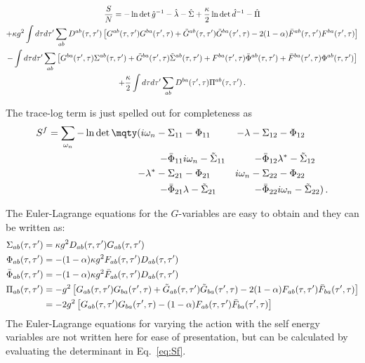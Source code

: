 \begin{widetext}
    \begin{multline}
        \label{eq:Sbeforesiding}
        \frac{S}{N} = - \ln\det{\hat{g}^{-1} -\hat{\lambda}-\hat{\Sigma}} +  \frac{\kappa}{2} \ln\det{\hat{d}^{-1}-\hat{\Pi}}
        \\
        + \kappa g^2\int d\tau d\tau^\prime\sum_{ab} D^{ab}(\tau,\tau^\prime)\left[G^{ab}(\tau,\tau^\prime)G^{ba}(\tau^\prime,\tau) +\Tilde{G}^{ab}(\tau,\tau^\prime)\Tilde{G}^{ba}(\tau^\prime,\tau) - 2(1-\alpha)\bar{F}^{ab}(\tau,\tau^\prime)F^{ba}(\tau^\prime,\tau)\right]
        \\
        - \int d\tau d\tau^\prime\sum_{ab} \left[
        G^{ba}(\tau^\prime,\tau)\Sigma^{ab}(\tau,\tau^\prime)
        + \Tilde{G}^{ba}(\tau^\prime,\tau)\Tilde{\Sigma}^{ab}(\tau,\tau^\prime)
        + F^{ba}(\tau^\prime,\tau) \Bar{\Phi}^{ab}(\tau,\tau^\prime)
        + \Bar{F}^{ba}(\tau^\prime,\tau)\Phi^{ab}(\tau,\tau^\prime) \right]
        \\
        +\frac{\kappa}{2}\int d\tau d\tau^\prime\sum_{ab}
        D^{ba}(\tau^\prime,\tau) \Pi^{ab}(\tau,\tau^\prime) \,.
\end{multline}
\end{widetext}
%
The trace-log term is just spelled out for completeness as
\begin{align}
    S^f = \sum_{\omega_n} -\ln\det\mqty(i\omega_n-\Sigma_{11} & -\Phi_{11} & -\lambda - \Sigma_{12} & -\Phi_{12} \\ -\bar{\Phi}_{11} & i\omega_n - \tilde{\Sigma}_{11} & -\bar{\Phi}_{12} & \lambda^\ast - \tilde{\Sigma}_{12} \\ -\lambda^\ast - \Sigma_{21} & -\Phi_{21} &i\omega_n-\Sigma_{22} & -\Phi_{22} \\ -\bar{\Phi}_{21} & \lambda - \tilde{\Sigma}_{21} & - \bar{\Phi}_{22} & i\omega_n - \tilde{\Sigma}_{22}) \,.
    \label{eq:Sf}
\end{align}

The Euler-Lagrange equations for the $G$-variables are easy to obtain and they can be written as: 
%
\begin{align}
     \Sigma_{ab}(\tau,\tau^\prime) &= \kappa g^2 D_{ab}(\tau,\tau^\prime)G_{ab}(\tau,\tau^\prime)
     \\
     \Phi_{ab}(\tau,\tau^\prime) &=  -(1-\alpha)\kappa g^2 F_{ab}(\tau,\tau^\prime) D_{ab}(\tau,\tau^\prime)
     \\
     \Bar{\Phi}_{ab}(\tau,\tau^\prime) &= -(1-\alpha)\kappa g^2\Bar{F}_{ab}(\tau,\tau^\prime) D_{ab}(\tau,\tau^\prime)
     \\
     \Pi_{ab}(\tau,\tau^\prime) &= -g^2\left[
     G_{ab}(\tau,\tau^\prime)G_{ba}(\tau^\prime,\tau)
     + \Tilde{G}_{ab}(\tau,\tau^\prime)\Tilde{G}_{ba}(\tau^\prime,\tau)
     -2(1-\alpha)F_{ab}(\tau,\tau^\prime)\Bar{F}_{ba}(\tau^\prime,\tau)\right] \nonumber \\
     &= -2 g^2\left[
     G_{ab}(\tau,\tau^\prime)G_{ba}(\tau^\prime,\tau)
     -(1-\alpha)F_{ab}(\tau,\tau^\prime)\Bar{F}_{ba}(\tau^\prime,\tau)\right] 
\end{align}
%
The Euler-Lagrange equations for varying the action with the self energy variables are not written here for ease of presentation, but can be calculated by evaluating the determinant in Eq.~\eqref{eq:Sf}.




